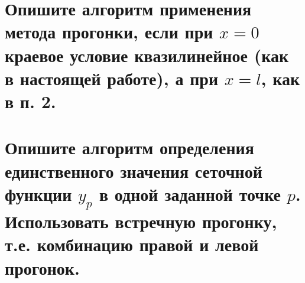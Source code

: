 

\section{Опишите алгоритм применения метода прогонки, если при $x = 0$ краевое условие квазилинейное (как в настоящей работе), а при $x = l$, как в п. 2.}


\clearpage

\section{Опишите алгоритм определения единственного значения сеточной функции $y_p$ в одной заданной точке $p$. Использовать встречную прогонку, т.е. комбинацию правой и левой прогонок.}

